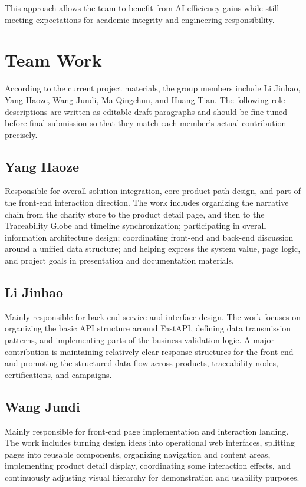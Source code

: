 \documentclass[11pt]{article}
\begin{document}
This approach allows the team to benefit from AI efficiency gains while still meeting expectations for academic integrity and engineering responsibility.

\section{Team Work}
According to the current project materials, the group members include Li Jinhao, Yang Haoze, Wang Jundi, Ma Qingchun, and Huang Tian. The following role descriptions are written as editable draft paragraphs and should be fine-tuned before final submission so that they match each member's actual contribution precisely.

\subsection*{Yang Haoze}
Responsible for overall solution integration, core product-path design, and part of the front-end interaction direction. The work includes organizing the narrative chain from the charity store to the product detail page, and then to the Traceability Globe and timeline synchronization; participating in overall information architecture design; coordinating front-end and back-end discussion around a unified data structure; and helping express the system value, page logic, and project goals in presentation and documentation materials.

\subsection*{Li Jinhao}
Mainly responsible for back-end service and interface design. The work focuses on organizing the basic API structure around FastAPI, defining data transmission patterns, and implementing parts of the business validation logic. A major contribution is maintaining relatively clear response structures for the front end and promoting the structured data flow across products, traceability nodes, certifications, and campaigns.

\subsection*{Wang Jundi}
Mainly responsible for front-end page implementation and interaction landing. The work includes turning design ideas into operational web interfaces, splitting pages into reusable components, organizing navigation and content areas, implementing product detail display, coordinating some interaction effects, and continuously adjusting visual hierarchy for demonstration and usability purposes.
\end{document}
